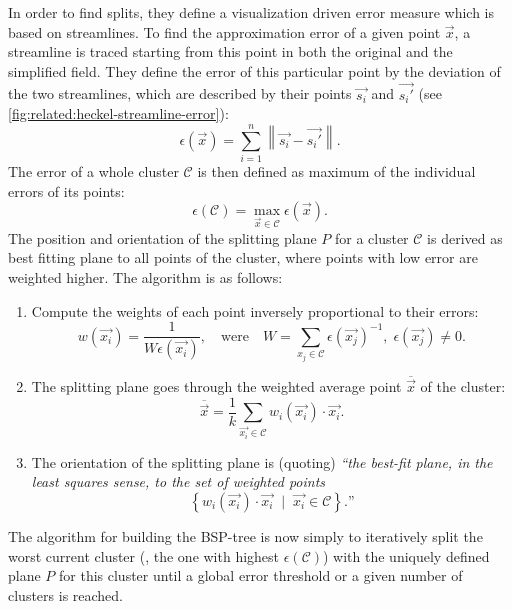 In order to find splits, they define a visualization driven error measure which is based on streamlines. To find the approximation error of a given point $\vec{x}$, a streamline is traced starting from this point in both the original and the simplified field. They define the error of this particular point by the deviation of the two streamlines, which are described by their points $\vec{s_i}$ and $\vec{s_i'}$ (see \autoref{fig:related:heckel-streamline-error}):
%
\begin{equation}
	\epsilon(\vec{x}) = \sum_{i=1}^{n}{\left\| \vec{s_i} - \vec{s_i'} \right\|}.
\end{equation}
%
The error of a whole cluster $\mathcal C$ is then defined as maximum of the individual errors of its points:
%
\begin{equation}
	\epsilon(\mathcal C) = \max_{\vec{x}\in\mathcal C}{\epsilon(\vec{x})}.
\end{equation}
%
The position and orientation of the splitting plane $P$ for a cluster $\mathcal C$ is derived as best fitting plane to all points of the cluster, where points with low error are weighted higher. The algorithm is as follows:
%
\begin{enumerate}
	\item Compute the weights of each point inversely proportional to their errors:
%
	\begin{equation}
		w(\vec{x_i}) = \frac{1}{W \epsilon(\vec{x_i})},
		\quad \text{were} \quad
		W = \sum_{x_j\in\mathcal C}{\epsilon(\vec{x_j})^{-1},
		\; \epsilon(\vec{x_j}) \neq 0.}
	\end{equation}
%
	\item The splitting plane goes through the weighted average point $\overline{\vec{x}}$ of the cluster:
%
		\begin{equation}
			\overline{\vec{x}} = \frac{1}{k} \sum_{\vec{x_i}\in\mathcal C} 
			                     {w_i(\vec{x_i}) \cdot \vec{x_i}}.
		\end{equation}
%
  \item The orientation of the splitting plane is (quoting) \emph{``the best-fit
plane, in the least squares sense, to the set of weighted points}
%
    \begin{equation}
      \left\{w_i(\vec{x_i}) \cdot \vec{x_i} \; \mid \; 
      \vec{x_i} \in \mathcal C\right\}.\text{''}
    \end{equation}
%
\end{enumerate}

The algorithm for building the \ac{BSP}-tree is now simply to iteratively split the worst current cluster (\ie, the one with highest $\epsilon(\mathcal C)$) with the uniquely defined plane $P$ for this cluster until a global error threshold or a given number of clusters is reached.

